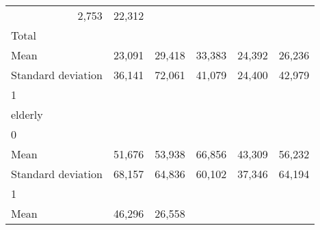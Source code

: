 \begin{tabular}{llllll}
  \multicolumn{1}{r}{2,753} &
  \multicolumn{1}{r}{22,312} \\
\multicolumn{1}{l}{\hspace{3em}Total} &
  \multicolumn{1}{|r}{} &
  \multicolumn{1}{r}{} &
  \multicolumn{1}{r}{} &
  \multicolumn{1}{r}{} &
  \multicolumn{1}{r}{} \\
\multicolumn{1}{l}{\hspace{4em}Mean} &
  \multicolumn{1}{|r}{23,091} &
  \multicolumn{1}{r}{29,418} &
  \multicolumn{1}{r}{33,383} &
  \multicolumn{1}{r}{24,392} &
  \multicolumn{1}{r}{26,236} \\
\multicolumn{1}{l}{\hspace{4em}Standard deviation} &
  \multicolumn{1}{|r}{36,141} &
  \multicolumn{1}{r}{72,061} &
  \multicolumn{1}{r}{41,079} &
  \multicolumn{1}{r}{24,400} &
  \multicolumn{1}{r}{42,979} \\
\multicolumn{1}{l}{\hspace{1em}1} &
  \multicolumn{1}{|r}{} &
  \multicolumn{1}{r}{} &
  \multicolumn{1}{r}{} &
  \multicolumn{1}{r}{} &
  \multicolumn{1}{r}{} \\
\multicolumn{1}{l}{\hspace{2em}elderly} &
  \multicolumn{1}{|r}{} &
  \multicolumn{1}{r}{} &
  \multicolumn{1}{r}{} &
  \multicolumn{1}{r}{} &
  \multicolumn{1}{r}{} \\
\multicolumn{1}{l}{\hspace{3em}0} &
  \multicolumn{1}{|r}{} &
  \multicolumn{1}{r}{} &
  \multicolumn{1}{r}{} &
  \multicolumn{1}{r}{} &
  \multicolumn{1}{r}{} \\
\multicolumn{1}{l}{\hspace{4em}Mean} &
  \multicolumn{1}{|r}{51,676} &
  \multicolumn{1}{r}{53,938} &
  \multicolumn{1}{r}{66,856} &
  \multicolumn{1}{r}{43,309} &
  \multicolumn{1}{r}{56,232} \\
\multicolumn{1}{l}{\hspace{4em}Standard deviation} &
  \multicolumn{1}{|r}{68,157} &
  \multicolumn{1}{r}{64,836} &
  \multicolumn{1}{r}{60,102} &
  \multicolumn{1}{r}{37,346} &
  \multicolumn{1}{r}{64,194} \\
\multicolumn{1}{l}{\hspace{3em}1} &
  \multicolumn{1}{|r}{} &
  \multicolumn{1}{r}{} &
  \multicolumn{1}{r}{} &
  \multicolumn{1}{r}{} &
  \multicolumn{1}{r}{} \\
\multicolumn{1}{l}{\hspace{4em}Mean} &
  \multicolumn{1}{|r}{46,296} &
  \multicolumn{1}{r}{26,558} &

\end{tabular}
